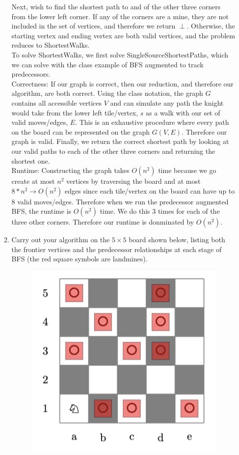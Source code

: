 \documentclass[11pt]{article}
\begin{document}
\begin{enumerate}
\begin{enumerate}
      Next, wish to find the shortest path to and of the other three corners from the lower left corner. If any of the corners are a mine, they are not included in the set of vertices, and therefore we return $\perp$. Otherwise, the starting vertex and ending vertex are both valid vertices, and the problem reduces to ShortestWalks. \\

      To solve ShortestWalks, we first solve SingleSourceShortestPaths, which we can solve with the class example of BFS augmented to track predecessors. \\
      
      Correctness: If our graph is correct, then our reduction, and therefore our algorithm, are both correct. Using the class notation, the graph $G$ contains all accessible vertices $V$ and can simulate any path the knight would take from the lower left tile/vertex, $s$ as a walk with our set of valid moves/edges, $E$. This is an exhaustive procedure where every path on the board can be represented on the graph $G(V,E)$. Therefore our graph is valid. Finally, we return the correct shortest path by looking at our valid paths to each of the other three corners and returning the shortest one. \\
      
      Runtime: Constructing the graph takes $O(n^2)$ time because we go create at most $n^2$ vertices by traversing the board and at most $8 * n^2 \rightarrow O(n^2)$ edges since each tile/vertex on the board can have up to 8 valid moves/edges. Therefore when we run the predecessor augmented BFS, the runtime is $O(n^2)$ time. We do this 3 times for each of the three other corners. Therefore our runtime is donminated by $\boxed{O(n^2)}$. \\

    \item Carry out your algorithm on the $5\times 5$ board shown below, listing both the frontier vertices and the predecessor relationships at each stage of BFS (the red square symbols are landmines).
    
    \begin{figure} [H]
    \centering
    \includegraphics[width=0.4\linewidth]{chessboard.png}


\end{figure}
\end{enumerate}
\end{enumerate}
\end{document}
